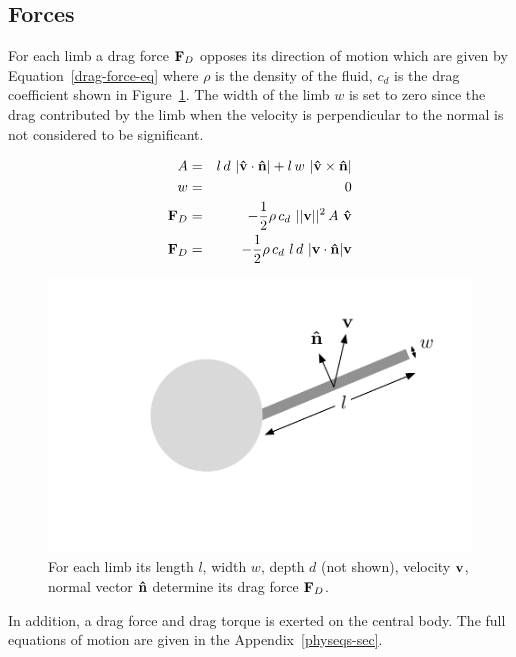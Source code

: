 \subsection{Forces}

For each limb a drag force $\mathbf{F}_D$ opposes its direction of motion
which are given by Equation~\ref{drag-force-eq} where $\rho$ is the
density of the fluid, $c_d$ is the drag coefficient shown in
Figure~\ref{drag-force}.  The width of the limb $w$ is set to zero
since the drag contributed by the limb when the velocity is
perpendicular to the normal is not considered to be significant.

\begin{eqnarray}
  A &=& l\,d~ |\mathbf{\hat{v}} \cdot \mathbf{\hat{n}}| + l\, w~|\mathbf{\hat{v}} \times \mathbf{\hat{n}}|\\
  w &=& 0 \\
  \mathbf{F}_D &=& -\frac{1}{2} \rho\,c_d~||\mathbf{v}||^2\,A~\mathbf{\hat{v}} \\
  \mathbf{F}_D &=& -\frac{1}{2} \rho\, c_d~ l\,d~|\mathbf{v} \cdot \mathbf{\hat{n}}|\mathbf{v} \label{drag-force-eq} 
\end{eqnarray}


\begin{figure}[h]  \label{drag-force}

  \begin{center} 
    \includegraphics[scale=0.7]{fig/drag-force.pdf} 
  \end{center} 
  \caption[Diagram of drag force]{For each limb its length $l$, width $w$, depth $d$ (not
    shown), velocity $\mathbf{v} $, normal vector $\mathbf{\hat{n}}$ determine its
    drag force $\mathbf{F}_D$.}
\end{figure}

In addition, a drag force and drag torque is exerted on the central
body.  The full equations of motion are given in the
Appendix~\ref{physeqs-sec}.


